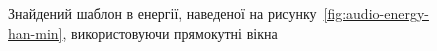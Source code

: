 \begin{figure}[!h]

            \caption{Знайдений шаблон в енергії, наведеної на рисунку~\ref{fig:audio-energy-han-min}, використовуючи
                прямокутні вікна}\label{fig:matched-energy-han-min-rect}
        \end{figure}

